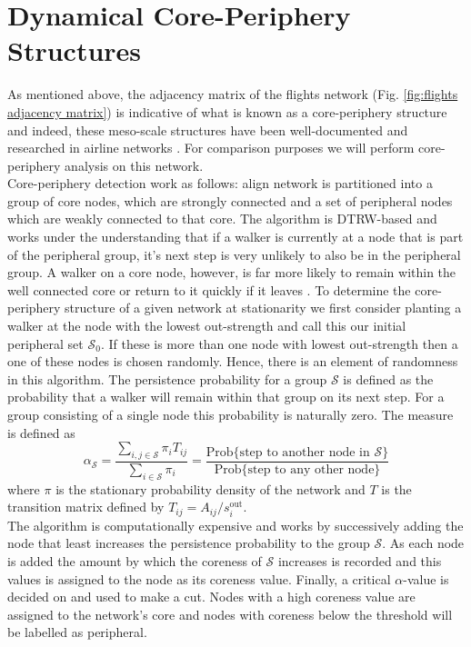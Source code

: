 \documentclass[12pt,a4paper]{article}
\begin{document}
\section{Dynamical Core-Periphery Structures}
As mentioned above, the adjacency matrix of the flights network (Fig. \ref{fig:flights adjacency matrix}) is indicative of what is known as a core-periphery structure \cite{kojaku2019multiscale} and indeed, these meso-scale structures have been well-documented and researched in airline networks \cite{kojaku2019multiscale}. For comparison purposes we will perform core-periphery analysis on this network.\\
Core-periphery detection work as follows: align network is partitioned into a group of core nodes, which are strongly connected and a set of peripheral nodes which are weakly connected to that core. The algorithm is DTRW-based and works under the understanding that if a walker is currently at a node that is part of the peripheral group, it's next step is very unlikely to also be in the peripheral group. A walker on a core node, however, is far more likely to remain within the well connected core or return to it quickly if it leaves \cite{lambiottenotes}. To determine the core-periphery structure of a given network at stationarity we first consider planting a walker at the node with the lowest out-strength and call this our initial peripheral set $\mathcal S_0$. If these is more than one node with lowest out-strength then a one of these nodes is chosen randomly. Hence, there is an element of randomness in this algorithm. The persistence probability for a group $\mathcal S$ is defined as the probability that a walker will remain within that group on its next step. For a group consisting of a single node this probability is naturally zero. The measure is defined as \cite{lambiottenotes}
$$\alpha_\mathcal S = \frac{\sum_{i,j \in \mathcal S}\pi_iT_{ij}}{\sum_{i \in \mathcal S}\pi_i} = \frac{\text{Prob\{step to another node in } \mathcal S \text{\}}}{\text{Prob\{step to any other node\}}}$$
where $\pi$ is the stationary probability density of the network and $T$ is the transition matrix defined by $T_{ij} = A_{ij}/s_i^{\text{out}}$.  \\
The algorithm is computationally expensive and works by successively adding the node that least increases the persistence probability to the group $\mathcal S$. As each node is added the amount by which the coreness of $\mathcal S$ increases is recorded and this values is assigned to the node as its coreness value. Finally, a critical $\alpha$-value is decided on and used to make a cut. Nodes with a high coreness value are assigned to the network's core and nodes with coreness below the threshold will be labelled as peripheral.  \medskip
\end{document}
